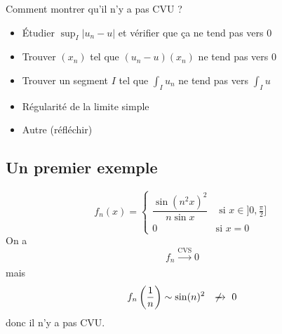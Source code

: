 Comment montrer qu'il n'y a pas CVU ?
\begin{itemize}
    \item Étudier $\sup_I|u_n-u|$ et vérifier que ça ne tend pas vers  $0$
    \item Trouver  $(x_n)$ tel que  $(u_n-u)(x_n)$ ne tend pas vers  $0$
    \item Trouver un segment  $I$ tel que  $\int_I u_n$ ne tend pas vers  $\int_Iu$
    \item Régularité de la limite simple
    \item Autre (réfléchir)
\end{itemize}

\subsection{Un premier exemple}

\[
    f_n(x)= \begin{cases}
        \dfrac{\sin(n^2x)^2}{n\sin x} &\text{ si } x \in  ]0, \frac{\pi}{2}]\\
        0 &\text{si }x=0
    \end{cases}
\] 
On a \[
    f_n \xrightarrow[]{\text{CVS}}0
\] 
mais \[
    f_n \left( \frac{1}{n} \right) \underset{}\sim \sin(n)^2 \xnrightarrow{}0
\] 
donc il n'y a pas CVU.
